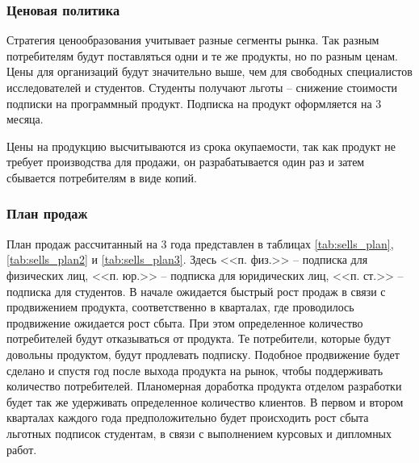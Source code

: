 \documentclass[../main]{subfiles}
\begin{document}
\subsubsection{Ценовая политика}
Стратегия ценообразования учитывает разные сегменты рынка. Так разным потребителям будут поставляться одни и те же продукты, но по разным ценам. Цены для организаций будут значительно выше, чем для свободных специалистов исследователей и студентов. Студенты получают льготы -- снижение стоимости подписки на программный продукт. Подписка на продукт оформляется на 3 месяца.

Цены на продукцию высчитываются из срока окупаемости, так как продукт не требует производства для продажи, он разрабатывается один раз и затем сбывается потребителям в виде копий.

\subsubsection{План продаж}

План продаж рассчитанный на 3 года представлен в таблицах \ref{tab:sells_plan}, \ref{tab:sells_plan2} и \ref{tab:sells_plan3}. Здесь <<п. физ.>> -- подписка для физических лиц, <<п. юр.>> -- подписка для юридических лиц, <<п. ст.>> -- подписка для студентов. В начале ожидается быстрый рост продаж в связи с продвижением продукта, соответственно в кварталах, где проводилось продвижение ожидается рост сбыта. При этом определенное количество потребителей будут отказываться от продукта. Те потребители, которые будут довольны продуктом, будут продлевать подписку. Подобное продвижение будет сделано и спустя год после выхода продукта на рынок, чтобы поддерживать количество потребителей. Планомерная доработка продукта отделом разработки будет так же удерживать определенное количество клиентов. В первом и втором кварталах каждого года предположительно будет происходить рост сбыта льготных подписок студентам, в связи с выполнением курсовых и дипломных работ.
\end{document}

